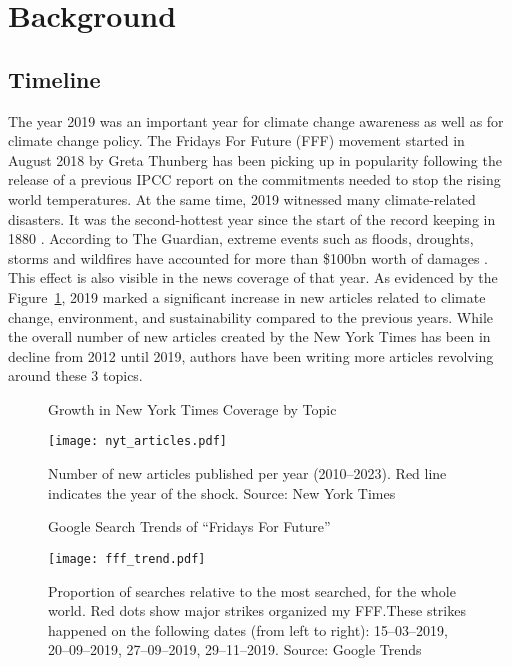 \documentclass[12pt]{article}
\begin{document}
\section{Background}\label{sect:background}

\subsection{Timeline} 

The year 2019 was an important year for climate change awareness as well as for climate change policy. The Fridays For Future (FFF) movement started in August 2018 by Greta Thunberg has been picking up in popularity following the release of a previous IPCC report on the commitments needed to stop the rising world temperatures. At the same time, 2019 witnessed many climate-related disasters. It was the second-hottest year since the start of the record keeping in 1880 \parencite{noaa2019global}. According to The Guardian, extreme events such as floods, droughts, storms and wildfires have accounted for more than \$100bn worth of damages \parencite{harvey2019climate}. This effect is also visible in the news coverage of that year. As evidenced by the Figure~\ref{fig:news_trends}, 2019 marked a significant increase in new articles related to climate change, environment, and sustainability compared to the previous years. While the overall number of new articles created by the New York Times has been in decline from 2012 until 2019, authors have been writing more articles revolving around these 3 topics. 


\begin{figure}[t]
    \caption{Growth in New York Times Coverage by Topic}\label{fig:news_trends}
    \texttt{[image: nyt\_articles.pdf]}
    \captionsetup{font=footnotesize}
    \caption*{Number of new articles published per year (2010--2023). Red line indicates the year of the shock. Source: New York Times}
\end{figure}

\begin{figure}[t]
    \caption{Google Search Trends of ``Fridays For Future''}\label{fig:fff_trend}
    \texttt{[image: fff\_trend.pdf]}
    \captionsetup{font=footnotesize}
    \caption*{Proportion of searches relative to the most searched, for the whole world. Red dots show major strikes organized my FFF.\@ These strikes happened on the following dates (from left to right): 15--03--2019, 20--09--2019, 27--09--2019, 29--11--2019. Source: Google Trends}
\end{figure}
\end{document}
